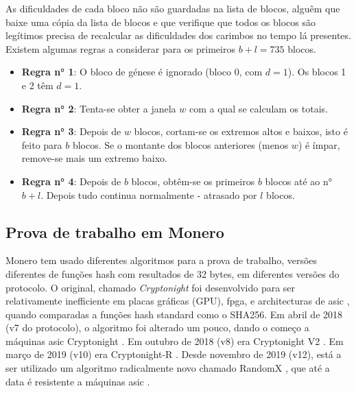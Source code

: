 As dificuldades de cada bloco não são guardadas na lista de blocos, alguêm que baixe uma cópia da lista de blocos e que verifique que todos os blocos são legítimos precisa de recalcular as dificuldades dos carimbos no tempo lá presentes. Existem algumas regras a considerar para os primeiros $b+l = 735$ blocos.
\begin{itemize}
    \item[] \textbf{Regra n° 1}: O bloco de génese é ignorado (bloco 0, com $d = 1$). Os blocos 1 e 2 têm $d = 1$.
    \item[] \textbf{Regra n° 2}: Tenta-se obter a janela $w$ com a qual se calculam os totais.  
    \item[] \textbf{Regra n° 3}: Depois de $w$ blocos, cortam-se os extremos altos e baixos, isto é feito para $b$ blocos. Se o montante dos blocos anteriores (menos $w$) é ímpar, remove-se mais um extremo baixo.
    \item[] \textbf{Regra n° 4}: Depois de $b$ blocos, obtêm-se os primeiros $b$ blocos até ao n° $b+l$. Depois tudo continua normalmente - atrasado por $l$ blocos.
\end{itemize}



\subsection*{Prova de trabalho em Monero}
Monero tem usado diferentes algoritmos para a prova de trabalho, versões diferentes de funções hash com resultados de 32 bytes, em diferentes versões do protocolo. O original, chamado {\em Cryptonight} foi desenvolvido para ser relativamente inefficiente em placas gráficas (GPU), fpga, e architecturas de asic \cite{CryptoNight}, quando comparadas a funções hash standard como o SHA256. Em abril de 2018 (v7 do protocolo), o algoritmo foi alterado um pouco, dando o começo a máquinas asic Cryptonight \cite{cryptonight7}. Em outubro de 2018 (v8) era Cryptonight V2 \cite{berylliumbullet-v8}. Em março de 2019 (v10) era Cryptonight-R \cite{boronbutterfly-v10}. Desde novembro de 2019 (v12), está a ser utilizado um algoritmo radicalmente novo chamado RandomX \cite{randomx-pr-5549}, que até a data é resistente a máquinas asic \cite{randomx}.   

